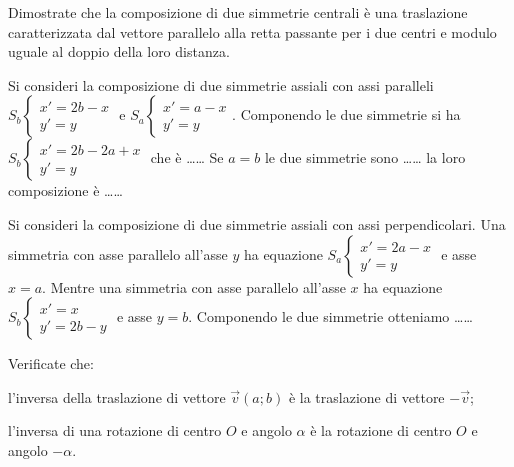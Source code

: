 \begin{esercizio}
\label{ese:8.79} %
Dimostrate che la composizione di due simmetrie centrali è una traslazione caratterizzata dal vettore parallelo alla retta passante per i due centri e modulo uguale al doppio della loro distanza.
\end{esercizio}

\begin{esercizio}
\label{ese:8.80} %
Si consideri la composizione di due simmetrie assiali con assi paralleli $S_b\begin{cases}x'=2b-x\\y'=y\end{cases}$ e $S_a\begin{cases}x'=a-x\\y'=y\end{cases}$.
Componendo le due simmetrie si ha $S_b\begin{cases}x'=2b-2a+x\\y'=y\end{cases}$ che è \ldots\ldots{}
Se $a=b$ le due simmetrie sono \ldots\ldots{} la loro composizione è \ldots\dots{}
\end{esercizio}

\begin{esercizio}
\label{ese:8.81} %
Si consideri la composizione di due simmetrie assiali con assi perpendicolari.
Una simmetria con asse parallelo all'asse $y$ ha equazione $S_a\begin{cases}x'=2a-x\\y'=y\end{cases}$ e asse $x = a$.
Mentre una simmetria con asse parallelo all'asse $x$ ha equazione $S_b\begin{cases}x'=x\\y'=2b-y\end{cases}$ e asse $y = b$.
Componendo le due simmetrie otteniamo \ldots\ldots{}
\end{esercizio}

\begin{esercizio}
\label{ese:8.82} %
Verificate che:
\begin{enumeratea}
\item l'inversa della traslazione di vettore $\vec{v}(a;b)$ è la traslazione di vettore $-\vec{v}$;
\item l'inversa di una rotazione di centro $O$ e angolo $\alpha$ è la rotazione di centro $O$ e angolo $-\alpha$.
\end{enumeratea}
\end{esercizio}

